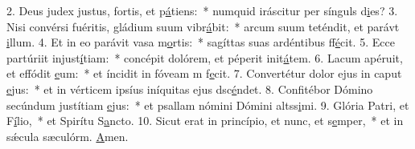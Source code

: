2. Deus judex justus, fortis, et p\uline{á}tiens:~* numquid iráscitur per sínguls d\uline{i}es?
3. Nisi convérsi fuéritis, gládium suum vibr\uline{á}bit:~* arcum suum teténdit, et parávt \uline{i}llum.
4. Et in eo parávit vasa m\uline{o}rtis:~* sagíttas suas ardéntibus ff\uline{é}cit.
5. Ecce partúriit injust\uline{í}tiam:~* concépit dolórem, et péperit init\uline{á}tem.
6. Lacum apéruit, et effódit \uline{e}um:~* et íncidit in fóveam m f\uline{e}cit.
7. Convertétur dolor ejus in caput \uline{e}jus:~* et in vérticem ipsíus iníquitas ejus dsc\uline{é}ndet.
8. Confitébor Dómino secúndum justítiam \uline{e}jus:~* et psallam nómini Dómini altss\uline{i}mi.
9. Glória Patri, et F\uline{í}lio,~* et Spirítu S\uline{a}ncto.
10. Sicut erat in princípio, et nunc, et s\uline{e}mper,~* et in sǽcula sæculórm. \uline{A}men.
